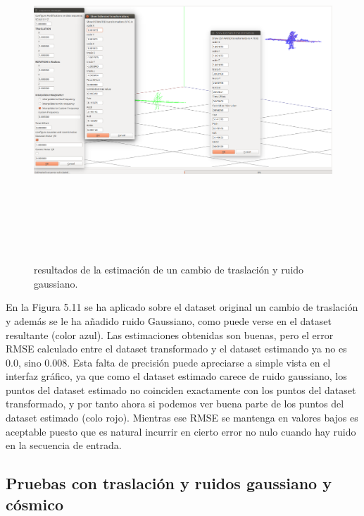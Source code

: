 \begin{figure}[h]
\begin{center}
\label{fig:opciones de View}\includegraphics[height=12.0cm,width=18.0cm]{img/cap6/Trasla_GaussNoise_abba.png}
\hspace{0.5cm}

\end{center}

\caption{ resultados de la estimación de un cambio de traslación y ruido gaussiano.}
\end{figure}
En la Figura 5.11 se ha aplicado sobre el dataset original un cambio de traslación y además se le ha añadido ruido Gaussiano, como puede verse en el dataset resultante (color azul). Las estimaciones obtenidas son buenas, pero el error RMSE calculado entre el dataset transformado y el dataset estimando ya no es 0.0, sino 0.008. Esta falta de precisión puede apreciarse a simple vista en el interfaz gráfico, ya que como el dataset estimado carece de ruido gaussiano, los puntos del dataset estimado no coinciden exactamente con los puntos del dataset transformado, y por tanto ahora si podemos ver buena parte de los puntos del dataset estimado (colo rojo).
Mientras ese RMSE se mantenga en valores bajos es aceptable puesto que es natural incurrir en cierto error no nulo cuando hay ruido en la secuencia de entrada.

\subsection{Pruebas con traslación y ruidos gaussiano y cósmico}

